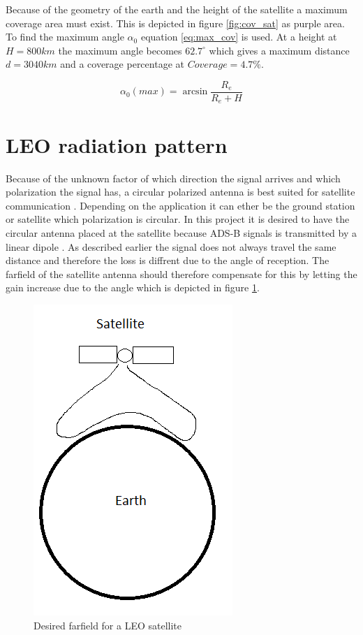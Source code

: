 Because of the geometry of the earth and the height of the satellite a maximum coverage area must exist. This is depicted in figure \ref{fig:cov_sat} as purple area. To find the maximum angle $\alpha_0$ equation \ref{eq:max_cov} is used. At a height at $H=800km$ the maximum angle becomes $62.7^\circ$ which gives a maximum distance $d = 3040km$ and a coverage percentage at $Coverage = 4.7\%$.

\begin{equation}
\alpha_0(max) = \arcsin{\frac{R_e}{R_e+H}}
\end{equation}
\label{eq:max_cov} 

\section{LEO radiation pattern}
Because of the unknown factor of which direction the signal arrives and which polarization the signal has, a circular polarized antenna is best suited for satellite communication \citep{Balanis2005}. Depending on the application it can ether be the ground station or satellite which polarization is circular. In this project it is desired to have the circular antenna placed at the satellite because ADS-B signals is transmitted by a linear dipole \citep{itu2017}. As described earlier the signal does not always travel the same distance and therefore the loss is diffrent due to the angle of reception. The farfield of the satellite antenna should therefore compensate for this by letting the gain increase due to the angle which is depicted in figure \ref{fig:sat_farfield}.   

\begin{figure}[H]
\centering 
\includegraphics[scale = 0.7]{figures/linkbudget/sat_farfield.png}
\caption{Desired farfield for a LEO satellite}
\label{fig:sat_farfield}
\end{figure} 

